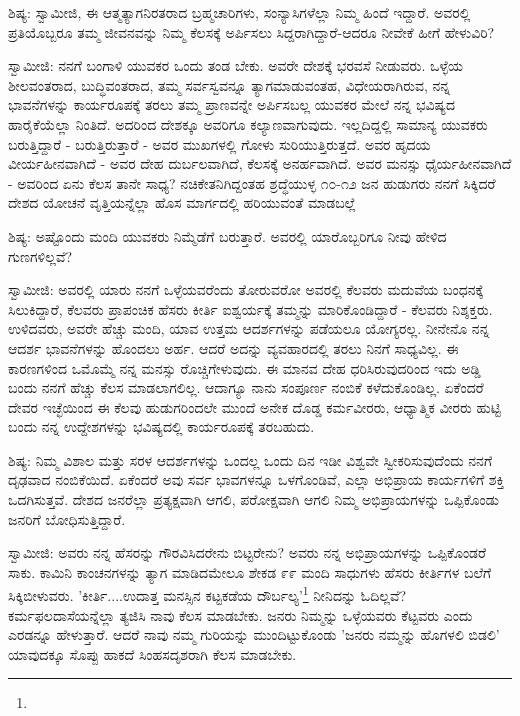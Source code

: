 ಶಿಷ್ಯ: ಸ್ವಾಮೀಜಿ, ಈ ಆತ್ಮತ್ಯಾಗನಿರತರಾದ ಬ್ರಹ್ಮಚಾರಿಗಳು, ಸಂನ್ಯಾಸಿಗಳೆಲ್ಲಾ ನಿಮ್ಮ ಹಿಂದೆ ಇದ್ದಾರೆ. ಅವರಲ್ಲಿ ಪ್ರತಿಯೊಬ್ಬರೂ ತಮ್ಮ ಜೀವನವನ್ನು ನಿಮ್ಮ ಕೆಲಸಕ್ಕೆ ಅರ್ಪಿಸಲು ಸಿದ್ದರಾಗಿದ್ದಾರೆ-ಆದರೂ ನೀವೇಕೆ ಹೀಗೆ ಹೇಳುವಿರಿ?

ಸ್ವಾಮೀಜಿ: ನನಗೆ ಬಂಗಾಳಿ ಯುವಕರ ಒಂದು ತಂಡ ಬೇಕು. ಅವರೇ ದೇಶಕ್ಕೆ ಭರವಸೆ ನೀಡುವರು. ಒಳ್ಳೆಯ ಶೀಲವಂತರಾದ, ಬುದ್ಧಿವಂತರಾದ, ತಮ್ಮ ಸರ್ವಸ್ವವನ್ನೂ ತ್ಯಾಗಮಾಡುವಂತಹ, ವಿಧೇಯರಾಗಿರುವ, ನನ್ನ ಭಾವನೆಗಳನ್ನು ಕಾರ್ಯರೂಪಕ್ಕೆ ತರಲು ತಮ್ಮ ಪ್ರಾಣವನ್ನೇ ಅರ್ಪಿಸಬಲ್ಲ ಯುವಕರ ಮೇಲೆ ನನ್ನ ಭವಿಷ್ಯದ ಹಾರೈಕೆಯೆಲ್ಲಾ ನಿಂತಿದೆ. ಅದರಿಂದ ದೇಶಕ್ಕೂ ಅವರಿಗೂ ಕಲ್ಯಾಣವಾಗುವುದು. ಇಲ್ಲದಿದ್ದಲ್ಲಿ ಸಾಮಾನ್ಯ ಯುವಕರು ಬರುತ್ತಿದ್ದಾರೆ - ಬರುತ್ತಿರುತ್ತಾರೆ - ಅವರ ಮುಖಗಳಲ್ಲಿ ಗೋಳು ಸುರಿಯುತ್ತಿರುತ್ತದೆ. ಅವರ ಹೃದಯ ವೀರ್ಯಹೀನವಾಗಿದೆ - ಅವರ ದೇಹ ದುರ್ಬಲವಾಗಿದೆ, ಕೆಲಸಕ್ಕೆ ಅನರ್ಹವಾಗಿದೆ. ಅವರ ಮನಸ್ಸು ಧೈರ್ಯಹೀನವಾಗಿದೆ - ಅವರಿಂದ ಏನು ಕೆಲಸ ತಾನೇ ಸಾಧ್ಯ? ನಚಿಕೇತನಿಗಿದ್ದಂತಹ ಶ್ರದ್ಧೆಯುಳ್ಳ ೧೦-೧೨ ಜನ ಹುಡುಗರು ನನಗೆ ಸಿಕ್ಕಿದರೆ ದೇಶದ ಯೋಚನೆ ವೃತ್ತಿಯನ್ನೆಲ್ಲಾ ಹೊಸ ಮಾರ್ಗದಲ್ಲಿ ಹರಿಯುವಂತೆ ಮಾಡಬಲ್ಲೆ

ಶಿಷ್ಯ: ಅಷ್ಟೊಂದು ಮಂದಿ ಯುವಕರು ನಿಮ್ಮೆಡೆಗೆ ಬರುತ್ತಾರೆ. ಅವರಲ್ಲಿ ಯಾರೊಬ್ಬರಿಗೂ ನೀವು ಹೇಳಿದ ಗುಣಗಳಿಲ್ಲವೆ?

ಸ್ವಾಮೀಜಿ: ಅವರಲ್ಲಿ ಯಾರು ನನಗೆ ಒಳ್ಳೆಯವರೆಂದು ತೋರುವರೋ ಅವರಲ್ಲಿ ಕೆಲವರು ಮದುವೆಯ ಬಂಧನಕ್ಕೆ ಸಿಲುಕಿದ್ದಾರೆ, ಕೆಲವರು ಪ್ರಾಪಂಚಿಕ ಹೆಸರು ಕೀರ್ತಿ ಐಶ್ವರ್ಯಕ್ಕೆ ತಮ್ಮನ್ನು ಮಾರಿಕೊಂಡಿದ್ದಾರೆ - ಕೆಲವರು ನಿಶ್ಶಕ್ತರು. ಉಳಿದವರು, ಅವರೇ ಹೆಚ್ಚು ಮಂದಿ, ಯಾವ ಉತ್ತಮ ಆದರ್ಶಗಳನ್ನು ಪಡೆಯಲೂ ಯೋಗ್ಯರಲ್ಲ. ನೀನೇನೊ ನನ್ನ ಆದರ್ಶ ಭಾವನೆಗಳನ್ನು ಹೊಂದಲು ಅರ್ಹ. ಆದರೆ ಅದನ್ನು ವ್ಯವಹಾರದಲ್ಲಿ ತರಲು ನಿನಗೆ ಸಾಧ್ಯವಿಲ್ಲ. ಈ ಕಾರಣಗಳಿಂದ ಒಮೊಮ್ಮೆ ನನ್ನ ಮನಸ್ಸು ರೊಚ್ಚಿಗೇಳುವುದು. ಈ ಮಾನವ ದೇಹ ಧರಿಸಿರುವುದರಿಂದ ಇದು ಅಡ್ಡಿ ಬಂದು ನನಗೆ ಹೆಚ್ಚು ಕೆಲಸ ಮಾಡಲಾಗಲಿಲ್ಲ. ಆದಾಗ್ಯೂ ನಾನು ಸಂಪೂರ್ಣ ನಂಬಿಕೆ ಕಳೆದುಕೊಂಡಿಲ್ಲ. ಏಕೆಂದರೆ ದೇವರ ಇಚ್ಛೆಯಿಂದ ಈ ಕೆಲವು ಹುಡುಗರಿಂದಲೇ ಮುಂದೆ ಅನೇಕ ದೊಡ್ಡ ಕರ್ಮವೀರರು, ಆಧ್ಯಾತ್ಮಿಕ ವೀರರು ಹುಟ್ಟಿ ಬಂದು ನನ್ನ ಉದ್ದೇಶಗಳನ್ನು ಭವಿಷ್ಯದಲ್ಲಿ ಕಾರ್ಯರೂಪಕ್ಕೆ ತರಬಹುದು.

ಶಿಷ್ಯ: ನಿಮ್ಮ ವಿಶಾಲ ಮತ್ತು ಸರಳ ಆದರ್ಶಗಳನ್ನು ಒಂದಲ್ಲ ಒಂದು ದಿನ ಇಡೀ ವಿಶ್ವವೇ ಸ್ವೀಕರಿಸುವುದೆಂದು ನನಗೆ ದೃಢವಾದ ನಂಬಿಕೆಯಿದೆ. ಏಕೆಂದರೆ ಅವು ಸರ್ವ ಭಾವಗಳನ್ನೂ ಒಳಗೊಂಡಿವೆ, ಎಲ್ಲಾ ಅಭಿಪ್ರಾಯ ಕಾರ್ಯಗಳಿಗೆ ಶಕ್ತಿ ಒದಗಿಸುತ್ತವೆ. ದೇಶದ ಜನರೆಲ್ಲಾ ಪ್ರತ್ಯಕ್ಷವಾಗಿ ಆಗಲಿ, ಪರೋಕ್ಷವಾಗಿ ಆಗಲಿ ನಿಮ್ಮ ಅಭಿಪ್ರಾಯಗಳನ್ನು ಒಪ್ಪಿಕೊಂಡು ಜನರಿಗೆ ಬೋಧಿಸುತ್ತಿದ್ದಾರೆ.

ಸ್ವಾಮೀಜಿ: ಅವರು ನನ್ನ ಹೆಸರನ್ನು ಗೌರವಿಸಿದರೇನು ಬಿಟ್ಟರೇನು? ಅವರು ನನ್ನ ಅಭಿಪ್ರಾಯಗಳನ್ನು ಒಪ್ಪಿಕೊಂಡರೆ ಸಾಕು. ಕಾಮಿನಿ ಕಾಂಚನಗಳನ್ನು ತ್ಯಾಗ ಮಾಡಿದಮೇಲೂ ಶೇಕಡ ೯೯ ಮಂದಿ ಸಾಧುಗಳು ಹೆಸರು ಕೀರ್ತಿಗಳ ಬಲೆಗೆ ಸಿಕ್ಕಿಬೀಳುವರು. 'ಕೀರ್ತಿ....ಉದಾತ್ತ ಮನಸ್ಸಿನ ಕಟ್ಟಕಡೆಯ ದೌರ್ಬಲ್ಯ'\footnote{} ನೀನಿದನ್ನು ಓದಿಲ್ಲವೆ? ಕರ್ಮಫಲದಾಸೆಯನ್ನೆಲ್ಲಾ ತ್ಯಜಿಸಿ ನಾವು ಕೆಲಸ ಮಾಡಬೇಕು. ಜನರು ನಿಮ್ಮನ್ನು ಒಳ್ಳೆಯವರು ಕೆಟ್ಟವರು ಎಂದು ಎರಡನ್ನೂ ಹೇಳುತ್ತಾರೆ. ಆದರೆ ನಾವು ನಮ್ಮ ಗುರಿಯನ್ನು ಮುಂದಿಟ್ಟುಕೊಂಡು 'ಜನರು ನಮ್ಮನ್ನು ಹೊಗಳಲಿ ಬಿಡಲಿ' ಯಾವುದಕ್ಕೂ ಸೊಪ್ಪು ಹಾಕದೆ ಸಿಂಹಸದೃಶರಾಗಿ ಕೆಲಸ ಮಾಡಬೇಕು.


